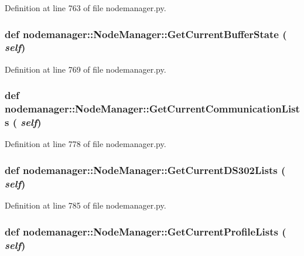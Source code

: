 Definition at line 763 of file nodemanager.py.\hypertarget{classnodemanager_1_1NodeManager_cf7deb7b847cb8a6cd7a3af6b8070097}{
\subsubsection[GetCurrentBufferState]{\setlength{\rightskip}{0pt plus 5cm}def nodemanager::Node\-Manager::Get\-Current\-Buffer\-State ( {\em self})}}
\label{classnodemanager_1_1NodeManager_cf7deb7b847cb8a6cd7a3af6b8070097}




Definition at line 769 of file nodemanager.py.\hypertarget{classnodemanager_1_1NodeManager_74dfed4678ba786356b8d03873d01cec}{
\subsubsection[GetCurrentCommunicationLists]{\setlength{\rightskip}{0pt plus 5cm}def nodemanager::Node\-Manager::Get\-Current\-Communication\-Lists ( {\em self})}}
\label{classnodemanager_1_1NodeManager_74dfed4678ba786356b8d03873d01cec}




Definition at line 778 of file nodemanager.py.\hypertarget{classnodemanager_1_1NodeManager_18ce6167b3340d17fc7962323ae344b6}{
\subsubsection[GetCurrentDS302Lists]{\setlength{\rightskip}{0pt plus 5cm}def nodemanager::Node\-Manager::Get\-Current\-DS302Lists ( {\em self})}}
\label{classnodemanager_1_1NodeManager_18ce6167b3340d17fc7962323ae344b6}




Definition at line 785 of file nodemanager.py.\hypertarget{classnodemanager_1_1NodeManager_b0da4084ac671ac3c8948c42acc55b8c}{
\subsubsection[GetCurrentProfileLists]{\setlength{\rightskip}{0pt plus 5cm}def nodemanager::Node\-Manager::Get\-Current\-Profile\-Lists ( {\em self})}}
\label{classnodemanager_1_1NodeManager_b0da4084ac671ac3c8948c42acc55b8c}




